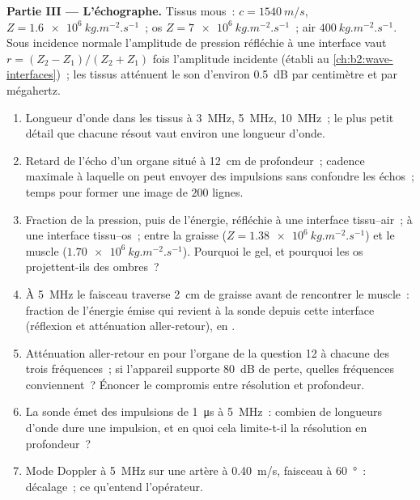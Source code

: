 \begin{problem}
\medskip
\noindent\textbf{Partie III --- L'échographe.}
Tissus mous~: $c = \qty{1540}{m/s}$, $Z = \qty{1.6e6}{kg.m^{-2}.s^{-1}}$~; os
$Z = \qty{7e6}{kg.m^{-2}.s^{-1}}$~; air $\qty{400}{kg.m^{-2}.s^{-1}}$. Sous
incidence normale l'amplitude de pression réfléchie à une interface vaut $r = (Z_2 -
Z_1)/(Z_2 + Z_1)$ fois l'amplitude incidente (établi au
\cref{ch:b2:wave-interfaces})~; les tissus atténuent le son d'environ
\qty{0.5}{dB} par centimètre et par mégahertz.
\begin{enumerate}[resume]
  \item Longueur d'onde dans les tissus à \qty{3}{MHz}, \qty{5}{MHz}, \qty{10}{MHz}~; le
        plus petit détail que chacune résout vaut environ une longueur d'onde.
  \item Retard de l'écho d'un organe situé à \qty{12}{cm} de profondeur~; cadence maximale à laquelle
        on peut envoyer des impulsions sans confondre les échos~; temps pour former une
        image de $200$ lignes.
  \item Fraction de la pression, puis de l'énergie, réfléchie à une interface
        tissu--air~; à une interface tissu--os~; entre la graisse
        ($Z = \qty{1.38e6}{kg.m^{-2}.s^{-1}}$) et le muscle
        ($\qty{1.70e6}{kg.m^{-2}.s^{-1}}$). Pourquoi le gel, et pourquoi les os
        projettent-ils des ombres~?
  \item À \qty{5}{MHz} le faisceau traverse \qty{2}{cm} de graisse avant de rencontrer le
        muscle~: fraction de l'énergie émise qui revient à la
        sonde depuis cette interface (réflexion et atténuation
        aller-retour), en .
  \item Atténuation aller-retour en  pour l'organe de la question 12
        à chacune des trois fréquences~; si l'appareil supporte
        \qty{80}{dB} de perte, quelles fréquences conviennent~? Énoncer le compromis
        entre résolution et profondeur.
  \item La sonde émet des impulsions de \qty{1}{\micro s} à \qty{5}{MHz}~: combien de
        longueurs d'onde dure une impulsion, et en quoi cela limite-t-il la résolution en
        profondeur~?
  \item Mode Doppler à \qty{5}{MHz} sur une artère à \qty{0.40}{m/s}, faisceau à
        \qty{60}{\degree}~: décalage~; ce qu'entend l'opérateur.
\end{enumerate}


\end{problem}
